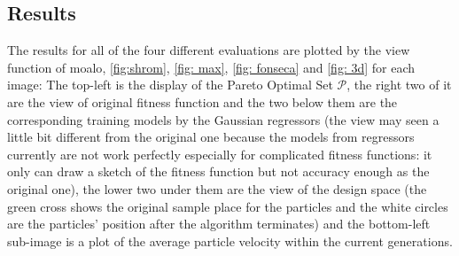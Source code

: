 \documentclass[12pt, runningheads,a4paper]{llncs}
\begin{document}


\subsection{Results}
The results for all of the four different evaluations are plotted by the view function of \ac{moalo}, \ref{fig:shrom}, \ref{fig: max}, \ref{fig: fonseca} and \ref{fig: 3d} for each image: The top-left is the display of the Pareto Optimal Set $\mathcal{P}$, the right two of it are the view of original fitness function and the two below them are the corresponding training models by the Gaussian regressors (the view may seen a little bit different from the original one because the models from regressors currently are not work perfectly especially for complicated fitness functions: it only can draw a sketch of the fitness function but not accuracy enough as the original one), the lower two under them are the view of the design space (the green cross shows the original sample place for the particles and the white circles are the particles' position after the algorithm terminates) and the bottom-left sub-image is a plot of the average particle velocity within the current generations.
\end{document}
